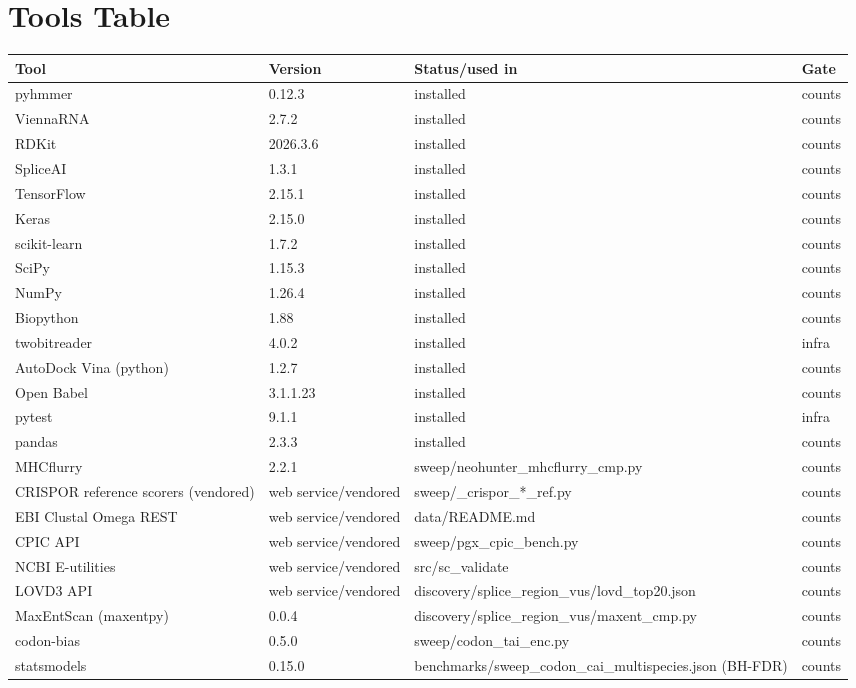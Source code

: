 \appendix\section{Tools Table}\begin{center}\small\begin{tabular}{lp{1.8cm}p{7.5cm}l}\hline Tool & Version & Status/used in & Gate\\\hline
pyhmmer & 0.12.3 & installed & counts\\
ViennaRNA & 2.7.2 & installed & counts\\
RDKit & 2026.3.6 & installed & counts\\
SpliceAI & 1.3.1 & installed & counts\\
TensorFlow & 2.15.1 & installed & counts\\
Keras & 2.15.0 & installed & counts\\
scikit-learn & 1.7.2 & installed & counts\\
SciPy & 1.15.3 & installed & counts\\
NumPy & 1.26.4 & installed & counts\\
Biopython & 1.88 & installed & counts\\
twobitreader & 4.0.2 & installed & infra\\
AutoDock Vina (python) & 1.2.7 & installed & counts\\
Open Babel & 3.1.1.23 & installed & counts\\
pytest & 9.1.1 & installed & infra\\
pandas & 2.3.3 & installed & counts\\
MHCflurry & 2.2.1 & sweep/neohunter\_mhcflurry\_cmp.py & counts\\
CRISPOR reference scorers (vendored) & web service/vendored & sweep/\_crispor\_*\_ref.py & counts\\
EBI Clustal Omega REST & web service/vendored & data/README.md & counts\\
CPIC API & web service/vendored & sweep/pgx\_cpic\_bench.py & counts\\
NCBI E-utilities & web service/vendored & src/sc\_validate & counts\\
LOVD3 API & web service/vendored & discovery/splice\_region\_vus/lovd\_top20.json & counts\\
MaxEntScan (maxentpy) & 0.0.4 & discovery/splice\_region\_vus/maxent\_cmp.py & counts\\
codon-bias & 0.5.0 & sweep/codon\_tai\_enc.py & counts\\
statsmodels & 0.15.0 & benchmarks/sweep\_codon\_cai\_multispecies.json (BH-FDR) & counts\\

\end{tabular}
\end{center}
